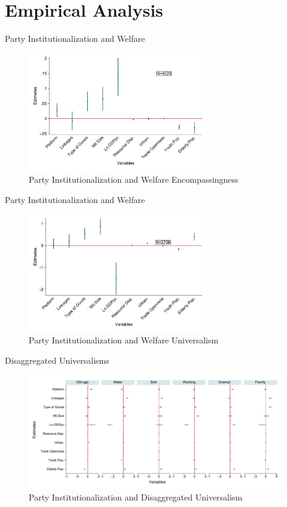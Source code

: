 \documentclass{Bredelebeamer}
\begin{document}
\section{Empirical Analysis}
\begin{frame}{Party Institutionalization and Welfare}
\begin{figure}
	\centering
	\includegraphics[width=0.7\textwidth]{"../4. Figures/Coefplot1"}
	\caption{Party Institutionalization and Welfare Encompassingness}
	\label{fig:coefplot1}
\end{figure}
\end{frame}

\begin{frame}{Party Institutionalization and Welfare}
	\begin{figure}
		\centering
		\includegraphics[width=0.7\textwidth]{"../4. Figures/Coefplot2"}
		\caption{Party Institutionalization and Welfare Universalism}
		\label{fig:coefplot2}
	\end{figure}
\end{frame}

\begin{frame}{Disaggregated Universalisms}
\begin{figure}
	\centering
	\includegraphics[width=1\textwidth]{"../4. Figures/Coefplot3"}
	\caption{Party Institutionalization and Disaggregated Universalism}
	\label{fig:coefplot3}
\end{figure}
\end{frame}
\end{document}
